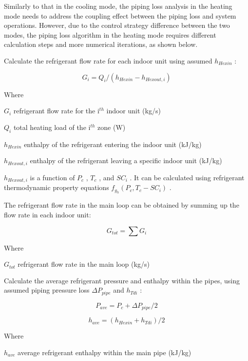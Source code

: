 Similarly to that in the cooling mode, the piping loss analysis in the heating mode needs to address the coupling effect between the piping loss and system operations. However, due to the control strategy difference between the two modes, the piping loss algorithm in the heating mode requires different calculation steps and more numerical iterations, as shown below.

Calculate the refrigerant flow rate for each indoor unit using assumed \(h_{Hexin}\) :

\begin{equation}
G_i = Q_i/(h_{Hexin}-h_{Hexout,i})
\end{equation}

Where

\(G_i\) refrigerant flow rate for the i\(^{th}\) indoor unit (kg/s)

\(Q_i\) total heating load of the i\(^{th}\) zone (W)

\(h_{Hexin}\) enthalpy of the refrigerant entering the indoor unit (kJ/kg)

\(h_{Hexout,i}\) enthalpy of the refrigerant leaving a specific indoor unit (kJ/kg)

\(h_{Hexout,i}\) is a function of \(P_c\) , \(T_c\) , and \(SC_i\) . It can be calculated using refrigerant thermodynamic property equations \(f_{g_h}(P_c,T_c-SC_i)\) .

The refrigerant flow rate in the main loop can be obtained by summing up the flow rate in each indoor unit:

\begin{equation}
G_{tot} = \sum{G_i}
\end{equation}

Where

\(G_{tot}\) refrigerant flow rate in the main loop (kg/s)

Calculate the average refrigerant pressure and enthalpy within the pipes, using assumed piping pressure loss \(\Delta{P_{pipe}}\) and \(h_{Tdi}\) :

\begin{equation}
P_{ave} = P_c+\Delta{P_{pipe}}/2
\end{equation}

\begin{equation}
h_{ave} = (h_{Hexin}+h_{Tdi})/2
\end{equation}

Where

\(h_{ave}\) average refrigerant enthalpy within the main pipe (kJ/kg)

